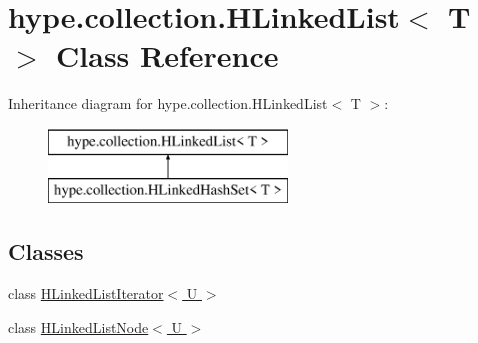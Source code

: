 \hypertarget{classhype_1_1collection_1_1_h_linked_list_3_01_t_01_4}{\section{hype.\-collection.\-H\-Linked\-List$<$ T $>$ Class Reference}
\label{classhype_1_1collection_1_1_h_linked_list_3_01_t_01_4}
}
Inheritance diagram for hype.\-collection.\-H\-Linked\-List$<$ T $>$\-:\begin{figure}[H]
\begin{center}
\leavevmode
\includegraphics[height=2.000000cm]{classhype_1_1collection_1_1_h_linked_list_3_01_t_01_4}
\end{center}
\end{figure}
\subsection*{Classes}
\begin{DoxyCompactItemize}
\item 
class \hyperlink{classhype_1_1collection_1_1_h_linked_list_3_01_t_01_4_1_1_h_linked_list_iterator_3_01_u_01_4}{H\-Linked\-List\-Iterator$<$ U $>$}
\item 
class \hyperlink{classhype_1_1collection_1_1_h_linked_list_3_01_t_01_4_1_1_h_linked_list_node_3_01_u_01_4}{H\-Linked\-List\-Node$<$ U $>$}
\end{DoxyCompactItemize}
